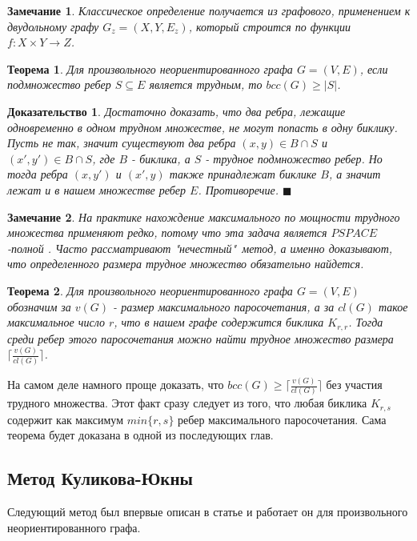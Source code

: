 \documentclass[a4paper]{article}
\newtheorem*{mremark}{Замечание}
\newtheorem*{mtheorem}{Теорема}
\newtheorem*{msolution}{Доказательство}
\begin{document}
\begin{mremark}
	Классическое определение получается из графового, применением к двудольному графу $G_z = (X, Y, E_z)$, 
	который строится по функции $f: X\times Y \rightarrow Z$.
\end{mremark}

	
\begin{mtheorem}
    Для произвольного неориентированного графа $G = (V, E)$, если подмножество ребер $S \subseteq E$ 
    является трудным, то $bcc(G) \geq |S|$.
\end{mtheorem}

\begin{msolution}
    Достаточно доказать, что два ребра, лежащие одновременно в одном трудном множестве, не могут 
    попасть в одну биклику. Пусть не так, значит существуют два ребра $(x, y)\in B\cap S$ и 
    $(x', y')\in B\cap S$, где $B$ - биклика, а $S$ - трудное подмножество ребер. Но тогда ребра 
    $(x, y')$ и $(x', y)$ также принадлежат биклике $B$, а значит лежат и в нашем множестве ребер 
    $E$. Противоречие. $\blacksquare$
\end{msolution}

\begin{mremark}
    На практике нахождение максимального по мощности трудного множества применяют редко, потому что 
    эта задача является $PSPACE$-полной \cite{HermannMarkus}. Часто рассматривают "нечестный"\ метод, 
    а именно доказывают, что определенного размера трудное множество обязательно найдется.
\end{mremark}

\begin{mtheorem}
    Для произвольного неориентированного графа $G = (V, E)$ обозначим за $v(G)$ - размер максимального 
    паросочетания, а за $cl(G)$ такое максимальное число $r$, что в нашем графе содержится биклика 
    $K_{r,r}$. Тогда среди ребер этого паросочетания можно найти трудное множество размера 
    $\Big\lceil\frac{v(G)}{cl(G)}\Big\rceil$. 
\end{mtheorem}

На самом деле намного проще доказать, что $bcc(G) \geq \Big\lceil\frac{v(G)}{cl(G)}\Big\rceil$ 
без участия трудного множества. Этот факт сразу следует из того, что любая биклика $K_{r, s}$ 
содержит как максимум $min\{r, s\}$ ребер максимального паросочетания. Сама теорема будет доказана 
в одной из последующих глав.

\subsection{Метод Куликова-Юкны}
Следующий метод был впервые описан в статье \cite{KulikovJukna} и работает он для произвольного 
неориентированного графа.
\end{document}
